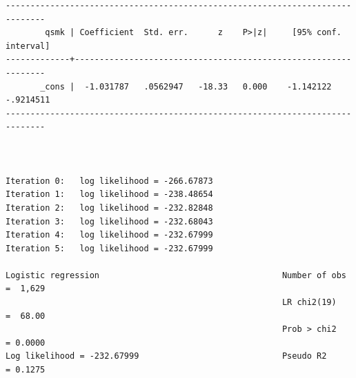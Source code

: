 \documentclass[
  10pt,
]{book}
\begin{document}
\begin{verbatim}
------------------------------------------------------------------------------
        qsmk | Coefficient  Std. err.      z    P>|z|     [95% conf. interval]
-------------+----------------------------------------------------------------
       _cons |  -1.031787   .0562947   -18.33   0.000    -1.142122   -.9214511
------------------------------------------------------------------------------



Iteration 0:   log likelihood = -266.67873  
Iteration 1:   log likelihood = -238.48654  
Iteration 2:   log likelihood = -232.82848  
Iteration 3:   log likelihood = -232.68043  
Iteration 4:   log likelihood = -232.67999  
Iteration 5:   log likelihood = -232.67999  

Logistic regression                                     Number of obs =  1,629
                                                        LR chi2(19)   =  68.00
                                                        Prob > chi2   = 0.0000
Log likelihood = -232.67999                             Pseudo R2     = 0.1275


\end{verbatim}
\end{document}
